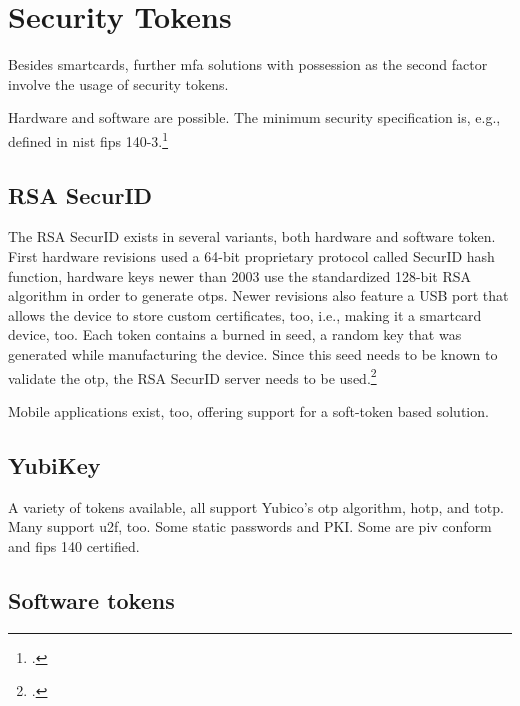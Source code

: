 \section{Security Tokens}

Besides smartcards, further \gls{mfa} solutions with possession as the second factor involve the usage of security tokens.

Hardware and software are possible. The minimum security specification is, e.g., defined in \gls{nist} \gls{fips} 140-3.\footcites[See][]{FIPS140-3}

\subsection{RSA SecurID}

The RSA SecurID exists in several variants, both hardware and software token. First hardware revisions used a 64-bit proprietary protocol called \frqq SecurID hash function\flqq, hardware keys newer than 2003 use the standardized 128-bit RSA algorithm in order to generate \glspl{otp}. Newer revisions also feature a USB port that allows the device to store custom certificates, too, i.e., making it a smartcard device, too. Each token contains a burned in seed, a random key that was generated while manufacturing the device. Since this seed needs to be known to validate the \gls{otp}, the RSA SecurID server needs to be used.\footcites[See][479--480]{eckert-it-sec-9}

Mobile applications exist, too, offering support for a soft-token based solution.

\subsection{YubiKey}

A variety of tokens available, all support Yubico's \gls{otp} algorithm, \gls{hotp}, and \gls{totp}. Many support \gls{u2f}, too. Some static passwords and PKI. Some are \gls{piv} conform and \gls{fips} 140 certified.

\subsection{Software tokens}